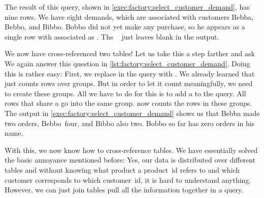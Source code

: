 The result of this query, shown in \cref{exec:factory:select_customer_demand}, has nine rows.
We have eight demands, which are associated with customers Bebba, Bebbo, and Bibbo.
Bobbo did not yet make any purchase, so he appears as a single row with  associated as .
The \psql\  just leaves  blank in the output.

We now have cross-referenced two tables!
Let us take this a step farther and ask 
We again answer this question in \cref{lst:factory:select_customer_demand}.
Doing this is rather easy:
First, we replace  in the query with .
We already learned that  just counts rows over groups.
But in order to let it count meaningfully, we need to create these groups.
All we have to do for this is to add a  to the query.
All rows that share a  go into the same group.
 now counts the rows in these groups.
The output in \cref{exec:factory:select_customer_demand} shows us that Bebba made two orders, Bebbo~four, and Bibbo also two.
Bobbo so far has zero orders in his name.

With this, we now know how to cross-reference tables.
We have essentially solved the basic annoyance mentioned before:
Yes, our data is distributed over different tables and without knowing what product a product~id refers to and which customer corresponds to which customer~id, it is hard to understand anything.
However, we can just join tables pull all the information together in a query.%
%
\FloatBarrier%
\endhsection%
%
%
%
%
%
\FloatBarrier%
\endhsection%
%
